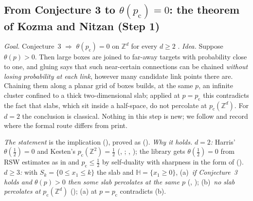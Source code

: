 \documentclass[11pt]{article}
\theoremstyle{definition}
\theoremstyle{remark}
\newcommand{\Zd}{\mathbb{Z}^d}
\newcommand{\ZZ}{\mathbb{Z}}
\newcommand{\pc}{p_{\mathrm c}}
\newcommand{\HH}{\mathbb{H}}
\begin{document}
\subsection{From Conjecture 3 to \texorpdfstring{$\theta(\pc)=0$}{theta(pc)=0}: the theorem of Kozma and Nitzan (Step 1)}\label{ss:thm6}
\emph{Goal.}  Conjecture~3 $\Rightarrow$ $\theta(\pc)=0$ on $\Zd$ for every $d\ge2$ \citep[Theorem~6]{KozmaNitzan2024}.
\emph{Idea.}  Suppose $\theta(p)>0$.  Then large boxes are joined to far-away targets with probability close to one, and gluing says that such
near-certain connections can be chained \emph{without losing probability at each link}, however many candidate link points there are.  Chaining
them along a planar grid of boxes builds, at the same $p$, an infinite cluster confined to a thick two-dimensional slab; applied at $p=\pc$ this
contradicts the fact that slabs, which sit inside a half-space, do not percolate at $\pc(\Zd)$.  For $d=2$ the conclusion is classical.
Nothing in this step is new; we follow \citep[\S4]{KozmaNitzan2024} and record where the formal route differs from print.

\emph{The statement} is the implication  (), proved as
 ().  \emph{Why it holds.}
\emph{$d=2$:} Harris' $\theta(\tfrac12)=0$ and Kesten's $\pc(\ZZ^2)=\tfrac12$ (, ;
, ); the library gets $\theta(\tfrac12)=0$ from RSW estimates
\citep{Russo1978,SeymourWelsh1978} as in \citep[Ch.~3]{BollobasRiordanPercolation2006} and $\pc\le\tfrac12$ by self-duality
\citep[Thm.~(11.11)]{GrimmettPercolation1999} with sharpness in the form of \citep{DuminilCopinTassionEM2016} ().
\emph{$d\ge3$:} with $S_k=\{0\le x_1\le k\}$ the slab and $\HH=\{x_1\ge0\}$, (a)~\emph{if Conjecture~3 holds and $\theta(p)>0$ then some slab
percolates at the same $p$} (, ); (b)~\emph{no slab percolates at
$\pc(\Zd)$} (); (a) at $p=\pc$ contradicts (b).
\end{document}
